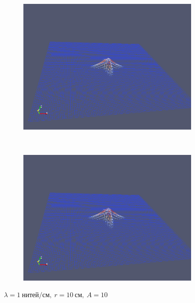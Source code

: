 \begin{figure}[H]
\begin{subfigure}[t]{0.5\textwidth}
        \includegraphics[width=\textwidth]{img/fiber/density_1_radius_10_amplitude_10/5.png}
    \end{subfigure}%
    ~
    \begin{subfigure}[t]{0.5\textwidth}
        \centering
        \includegraphics[width=\textwidth]{img/fiber/density_1_radius_10_amplitude_10/6.png}
    \end{subfigure}
    \caption{$\lambda=1~нитей/см,~r=10~см,~A=10$}
\end{figure}
